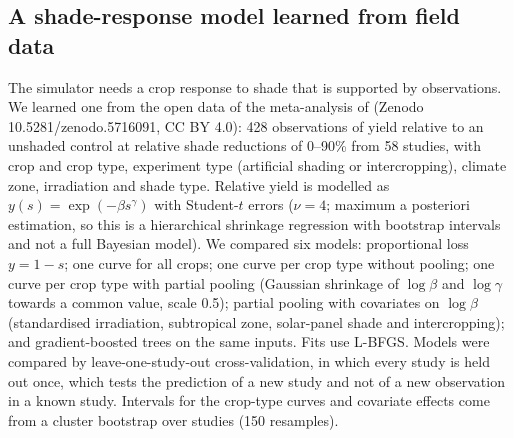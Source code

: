 \subsection{A shade-response model learned from field data}\label{sec:mlshade}
The simulator needs a crop response to shade that is supported by observations. We learned one from the open data of the meta-analysis of \citet{laub2022} (Zenodo 10.5281/zenodo.5716091, CC BY 4.0): 428 observations of yield relative to an unshaded control at relative shade reductions of 0--90\% from 58 studies, with crop and crop type, experiment type (artificial shading or intercropping), climate zone, irradiation and shade type. Relative yield is modelled as $y(s)=\exp(-\beta s^{\gamma})$ with Student-$t$ errors ($\nu=4$; maximum a posteriori estimation, so this is a hierarchical shrinkage regression with bootstrap intervals and not a full Bayesian model). We compared six models: proportional loss $y=1-s$; one curve for all crops; one curve per crop type without pooling; one curve per crop type with partial pooling (Gaussian shrinkage of $\log\beta$ and $\log\gamma$ towards a common value, scale 0.5); partial pooling with covariates on $\log\beta$ (standardised irradiation, subtropical zone, solar-panel shade and intercropping); and gradient-boosted trees on the same inputs. Fits use L-BFGS. Models were compared by leave-one-study-out cross-validation, in which every study is held out once, which tests the prediction of a new study and not of a new observation in a known study. Intervals for the crop-type curves and covariate effects come from a cluster bootstrap over studies (150 resamples).

